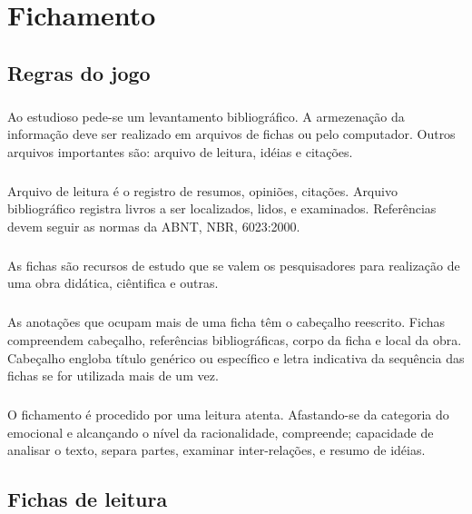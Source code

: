 \chapter{Fichamento}
\section{Regras do jogo}
\paragraph{}
Ao estudioso pede-se um levantamento bibliográfico. A armezenação da informação deve ser realizado em arquivos de fichas ou pelo computador. Outros arquivos importantes são: arquivo de leitura, idéias e citações.

\paragraph{}
Arquivo de leitura é o registro de resumos, opiniões, citações. Arquivo bibliográfico registra livros a ser localizados, lidos, e examinados. Referências devem seguir as normas da ABNT, NBR, 6023:2000.

\paragraph{}
As fichas são recursos de estudo que se valem os pesquisadores para realização de uma obra didática, ciêntifica e outras.

\paragraph{}
As anotações que ocupam mais de uma ficha têm o cabeçalho reescrito. Fichas compreendem cabeçalho, referências bibliográficas, corpo da ficha e local da obra. Cabeçalho engloba título genérico ou específico e letra indicativa da sequência das fichas se for utilizada mais de um vez.

\paragraph{}
O fichamento é procedido por uma leitura atenta. Afastando-se da categoria do emocional e alcançando o nível da racionalidade, compreende; capacidade de analisar o texto, separa partes, examinar inter-relações, e resumo de idéias.

\section{Fichas de leitura}


